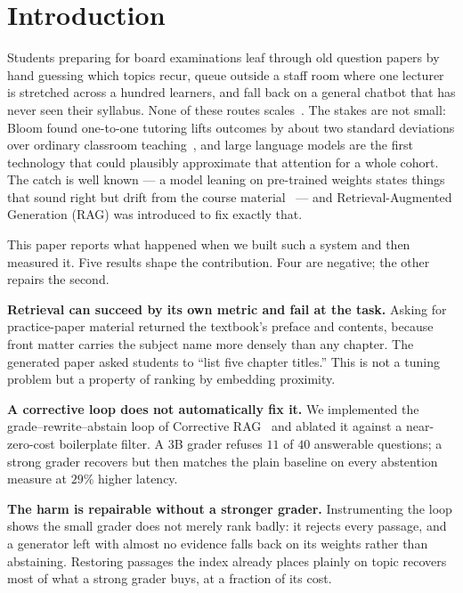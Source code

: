 \documentclass[conference]{IEEEtran}
\begin{document}
\section{Introduction}
Students preparing for board examinations leaf through old question papers by
hand guessing which topics recur, queue outside a staff room where one lecturer
is stretched across a hundred learners, and fall back on a general chatbot that
has never seen their syllabus. None of these routes
scales~\cite{lauber2025}. The stakes are not small: Bloom found one-to-one
tutoring lifts outcomes by about two standard deviations over ordinary
classroom teaching~\cite{bloom1984}, and large language models are the first
technology that could plausibly approximate that attention for a whole cohort.
The catch is well known --- a model leaning on pre-trained weights states things
that sound right but drift from the course material~\cite{lewis2020} --- and
Retrieval-Augmented Generation (RAG) was introduced to fix exactly that.

This paper reports what happened when we built such a system and then measured
it. Five results shape the contribution. Four are negative; the other repairs
the second.

\textbf{Retrieval can succeed by its own metric and fail at the task.} Asking
for practice-paper material returned the textbook's preface and contents,
because front matter carries the subject name more densely than any chapter.
The generated paper asked students to ``list five chapter titles.'' This is not
a tuning problem but a property of ranking by embedding proximity.

\textbf{A corrective loop does not automatically fix it.} We implemented the
grade--rewrite--abstain loop of Corrective RAG~\cite{yan2024crag} and ablated
it against a near-zero-cost boilerplate filter. A $3$B grader refuses $11$ of
$40$ answerable questions; a strong grader recovers but then matches the plain
baseline on every abstention measure at $29\%$ higher latency.

\textbf{The harm is repairable without a stronger grader.} Instrumenting the
loop shows the small grader does not merely rank badly: it rejects every
passage, and a generator left with almost no evidence falls back on its weights
rather than abstaining. Restoring passages the index already places plainly on
topic recovers most of what a strong grader buys, at a fraction of its cost.
\end{document}
